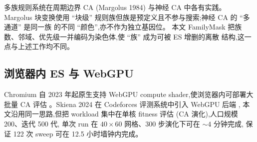 多族规则系统在周期边界 CA (Margolus 1984) \cite{margolus1984} 与神经 CA \cite{mordvintsev2020} 中各有实践。
Margolus 块变换使用 ``块级'' 规则族但族是预定义且不参与搜索;神经 CA 的 ``多通道'' 是同一族
的不同 ``颜色'',亦不作为独立基因位。
本文 FamilyMask 把族数、邻域、优先级一并编码为染色体,使 ``族'' 成为可被 ES 增删的离散
结构,这一点与上述工作均不同。

\subsection{浏览器内 ES 与 WebGPU}

Chromium 自 2023 年起原生支持 WebGPU compute shader,使浏览器内可部署大批量 CA 评估
\cite{webgpu2023}。Skiena 2024 在 Codeforces 评测系统中引入 WebGPU 后端 \cite{skiena2024},
本文沿用同一思路,但把 workload 集中在单核 fitness 评估 (CA 演化),人口规模 200、迭代 500 代,
单次 run 在 $40\!\times\! 60$ 网格、300 步演化下可在 $\sim\! 4$ 分钟完成,
保证 122 次 sweep 可在 12.5 小时墙钟内完成。

